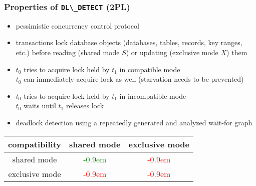 \begin{frame}
	\frametitle{Properties of \lstinline{DL\_DETECT} (2PL)}
	
	\begin{itemize}
		\item	pessimistic concurrency control protocol
		\item	transactions lock database objects (databases, tables, records, key ranges, etc.) before reading (shared mode $S$) or updating (exclusive mode $X$) them	\cite{Mohan:1990}
		\item	$t_0$ tries to acquire lock held by $t_1$ in compatible mode \\ \bm{$\rightarrow$} $t_0$ can immediately acquire lock as well (starvation needs to be prevented)
		\item	$t_0$ tries to acquire lock held by $t_1$ in incompatible mode \\ \bm{$\rightarrow$} $t_0$ waits until $t_1$ releases lock
		\item	deadlock detection using a repeatedly generated and analyzed wait-for graph
	\end{itemize}
	\newcommand{\plus}{\textcolor{green!15}{\LARGE\raisebox{-.0875em}{\bm{$\bullet$}}}\textcolor{green}{\kern-0.9em\bm{$\oplus$}}}
	\newcommand{\minus}{\textcolor{red!25}{\LARGE\raisebox{-.0875em}{\bm{$\bullet$}}}\textcolor{red}{\kern-0.9em\bm{$\ominus$}}}
	
	\centering
	\begin{tabular}{| c | c | c |}
															\hline
		compatibility	&	shared mode	&	exclusive mode		\\	\hline
		shared mode	&	\plus			&	\minus			\\	\hline
		exclusive mode	&	\minus		&	\minus			\\	\hline
	\end{tabular}%
\end{frame}

